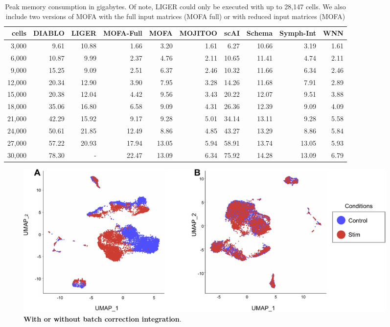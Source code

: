 \begin{table}[ht]
\centering
\caption[Peak Memory of MOJITOO]{Peak memory consumption in gigabytes. Of note, LIGER could only be executed with up to 28,147 cells. We also include  two versions of MOFA with the full input matrices (MOFA full) or with reduced input matrices (MOFA)}
\begin{tabular}{r|rrrrrrrrr}
  \hline
 cells & DIABLO & LIGER & MOFA-Full & MOFA & MOJITOO & scAI & Schema & Symph-Int & WNN \\ 
  \hline
  3,000 & 9.61 & 10.88 & 1.66 & 3.20 & 1.61 & 6.27 & 10.66 & 3.19 & 1.61 \\ 
  6,000 & 10.87 & 9.99 & 2.37 & 4.76 & 2.11 & 10.65 & 11.41 & 4.74 & 2.11 \\ 
  9,000 & 15.25 & 9.09 & 2.51 & 6.37 & 2.46 & 10.32 & 11.66 & 6.34 & 2.46 \\ 
  12,000 & 20.34 & 12.90 & 3.90 & 7.95 & 3.28 & 14.26 & 11.68 & 7.91 & 2.89 \\ 
  15,000 & 20.38 & 12.04 & 4.42 & 9.56 & 3.43 & 20.22 & 12.07 & 9.51 & 3.88 \\ 
  18,000 & 35.06 & 16.80 & 6.58 & 9.09 & 4.31 & 26.36 & 12.39 & 9.09 & 4.09 \\ 
  21,000 & 42.29 & 15.92 & 9.17 & 9.28 & 5.01 & 34.14 & 13.11 & 9.28 & 5.58 \\ 
  24,000 & 50.61 & 21.85 & 12.49 & 8.86 & 4.85 & 43.27 & 13.29 & 8.86 & 5.84 \\ 
  27,000 & 57.22 & 20.93 & 17.94 & 13.05 & 5.94 & 58.91 & 13.74 & 13.05 & 5.93 \\
  30,000 & 78.30 & - & 22.47 & 13.09 & 6.34 & 75.92 & 14.28 & 13.09 & 6.79 \\ 
   \hline
\end{tabular}
\label{tab:memory}
\end{table}


\begin{figure}[!ht]
  \centering
  \includegraphics[width=0.95\textwidth]{batch_correction/fig}
  \vspace{0.1cm}
  \caption[With or without batch correction integration.]{\textbf{With or without batch correction integration}.}
  \label{fig:batch_correction}
\end{figure}

